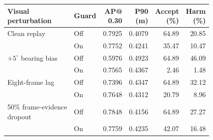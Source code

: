 \par\smallskip\noindent
\begin{minipage}{\columnwidth}
\centering\footnotesize
\captionsetup{hypcap=false}
\label{tab:visual-conflict}
\setlength{\tabcolsep}{2pt}
\begin{tabular*}{\columnwidth}{@{\extracolsep{\fill}}llrrrr@{}}
\toprule
\shortstack[l]{Visual\\perturbation} & Guard & \shortstack{AP@\\0.30} & \shortstack{P90\\(m)} & \shortstack{Accept\\(\%)} & \shortstack{Harm\\(\%)}\\
\midrule
Clean replay &Off&0.7925&0.4079&64.89&20.85\\
 &On&0.7752&0.4241&35.47&10.47\\
\addlinespace
\shortstack[l]{$+5^\circ$ bearing\\bias} &Off&0.5976&0.4923&64.89&46.09\\
 &On&0.7565&0.4367&2.46&1.48\\
\addlinespace
Eight-frame lag &Off&0.7396&0.4347&64.89&32.12\\
 &On&0.7648&0.4312&20.79&8.96\\
\addlinespace
\shortstack[l]{50\% frame-evidence\\dropout} &Off&0.7848&0.4156&64.89&27.27\\
 &On&0.7759&0.4235&42.07&16.48\\
\bottomrule
\end{tabular*}
\end{minipage}
\par\smallskip
